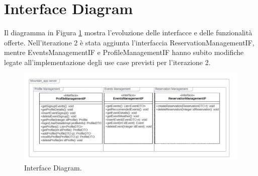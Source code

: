 \section{Interface Diagram}
Il diagramma in Figura \ref*{fig:InterfaceDiagramIt2} mostra l'evoluzione delle interfacce e delle funzionalità offerte.
Nell'iterazione 2 è stata aggiunta l'interfaccia ReservationManagementIF, mentre EventsManagementIF e ProfileManagementIF hanno subito
modifiche legate all'implementazione degli use case previsti per l'iterazione 2.
\begin{figure}[h!]
	\centering
	\includegraphics[width=1\textwidth]{Iterazione 2/diagrams/Interface.drawio.png}
	\caption{Interface Diagram.}
	\label{fig:InterfaceDiagramIt2}
\end{figure}
